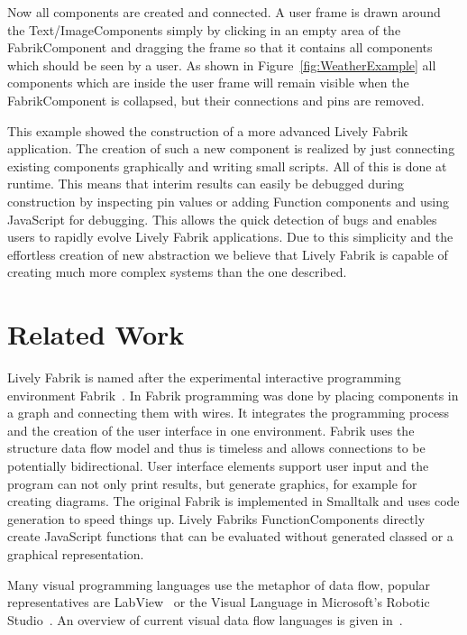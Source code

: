 \documentclass[pdftex, times, 10pt, twocolumn]{article}
\begin{document}
Now all components are created and connected. A user frame is drawn around the Text/ImageComponents simply by clicking in an empty area of the FabrikComponent and dragging the frame so that it contains all components which should be seen by a user. As shown in Figure~\ref{fig:WeatherExample} all components which are inside the user frame will remain visible when the FabrikComponent is collapsed, but their connections and pins are removed. 

This example showed the construction of a more advanced Lively Fabrik application. The creation of such a new component is realized by just connecting existing components graphically and writing small scripts. All of this is done at runtime. This means that interim results can easily be debugged during construction by inspecting pin values or adding Function components and using JavaScript for debugging. This allows the quick detection of bugs and enables users to rapidly evolve Lively Fabrik applications. Due to this simplicity and the effortless creation of new abstraction we believe that Lively Fabrik is capable of creating much more complex systems than the one described. 



\section{Related Work}
Lively Fabrik is named after the experimental interactive programming environment Fabrik~\cite{Ingalls1988FVP,Ludolph1988FPE}. In Fabrik programming was done by placing components in a graph and connecting them with wires. It integrates the programming process and the creation of the user interface in one environment. Fabrik uses the structure data flow model and thus is timeless and allows connections to be potentially bidirectional. User interface elements support user input and the program can not only print results, but generate graphics, for example for creating diagrams. The original Fabrik is implemented in Smalltalk and uses code generation to speed things up. Lively Fabriks FunctionComponents directly create JavaScript functions that can be evaluated without generated classed or a graphical representation.  

Many visual programming languages use the metaphor of data flow, popular representatives are LabView~\cite{Bitter2006LAP} or the Visual Language in Microsoft's Robotic Studio~\cite{Morgan2008PMR}. An overview of current visual data flow languages is given in~\cite{Johnston2004ADP}. 
\end{document}
